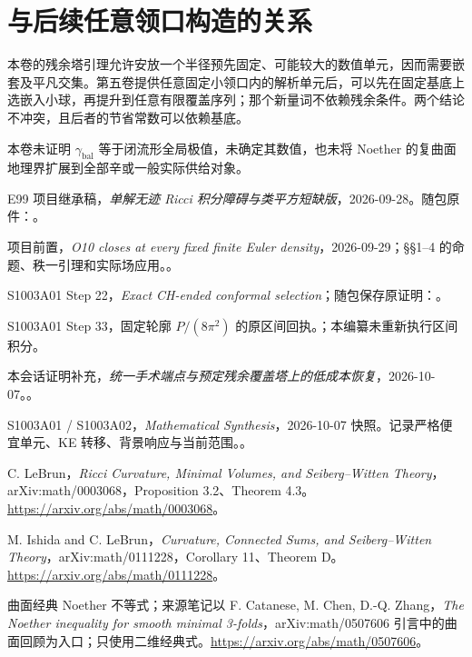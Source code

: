 \documentclass[UTF8,11pt,fontset=none]{ctexart}
\theoremstyle{definition}
\theoremstyle{remark}
\begin{document}
\section{与后续任意领口构造的关系}\label{v4-ux4e0eux540eux7eedux4efbux610fux9886ux53e3ux6784ux9020ux7684ux5173ux7cfb}

本卷的残余塔引理允许安放一个半径预先固定、可能较大的数值单元，因而需要嵌套及平凡交集。第五卷提供任意固定小领口内的解析单元后，可以先在固定基底上选嵌入小球，再提升到任意有限覆盖序列；那个新量词不依赖残余条件。两个结论不冲突，且后者的节省常数可以依赖基底。

本卷未证明 \(\gamma_{\mathrm{bal}}\) 等于闭流形全局极值，未确定其数值，也未将 Noether 的复曲面地理界扩展到全部辛或一般实际供给对象。 \cite{I07,I08,LeBrunRicci,BF,Noether}

\begin{thebibliography}{E99}
\small
{} 项目继承稿，\emph{单解无迹 Ricci 积分障碍与类平方短缺版}，2026-09-28。随包原件：。

 项目前置，\emph{O10 closes at every fixed finite Euler density}，2026-09-29；§§1--4 的命题、秩一引理和实际场应用。。

 S1003A01 Step 22，\emph{Exact CH-ended conformal selection}；随包保存原证明：。

 S1003A01 Step 33，固定轮廓 \(P/(8\pi^2)\) 的原区间回执。；本编纂未重新执行区间积分。

 本会话证明补充，\emph{统一手术端点与预定残余覆盖塔上的低成本恢复}，2026-10-07。。

 S1003A01 / S1003A02，\emph{Mathematical Synthesis}，2026-10-07 快照。记录严格便宜单元、KE 转移、背景响应与当前范围。。

 C. LeBrun，\emph{Ricci Curvature, Minimal Volumes, and Seiberg--Witten Theory}，arXiv:math/0003068，Proposition 3.2、Theorem 4.3。\url{https://arxiv.org/abs/math/0003068}。

 M. Ishida and C. LeBrun，\emph{Curvature, Connected Sums, and Seiberg--Witten Theory}，arXiv:math/0111228，Corollary 11、Theorem D。\url{https://arxiv.org/abs/math/0111228}。

 曲面经典 Noether 不等式；来源笔记以 F. Catanese, M. Chen, D.-Q. Zhang，\emph{The Noether inequality for smooth minimal 3-folds}，arXiv:math/0507606 引言中的曲面回顾为入口；只使用二维经典式。\url{https://arxiv.org/abs/math/0507606}。

\end{thebibliography}
\end{document}
